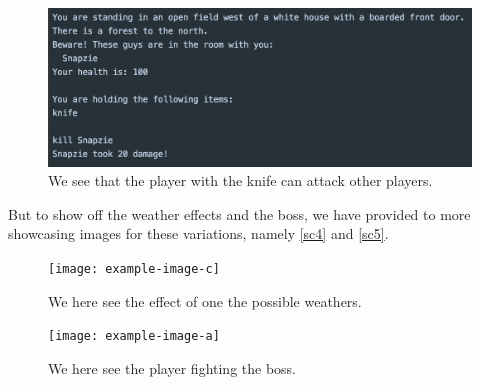 \begin{figure}[H]
	\centering
	\includegraphics[width=0.8\linewidth]{Materials/Results/AttackingPlayer}
	\caption{We see that the player with the knife can attack other players.}
	\label{sc3}
\end{figure}

But to show off the weather effects and the boss, we have provided to more showcasing images for these variations, namely \autoref{sc4} and \autoref{sc5}.

\begin{figure}[H]
	\centering
	\texttt{[image: example-image-c]}
	\caption{We here see the effect of one the possible weathers.}
	\label{sc4}
\end{figure}

\begin{figure}[H]
	\centering
	\texttt{[image: example-image-a]}
	\caption{We here see the player fighting the boss.}
	\label{sc5}
\end{figure}

